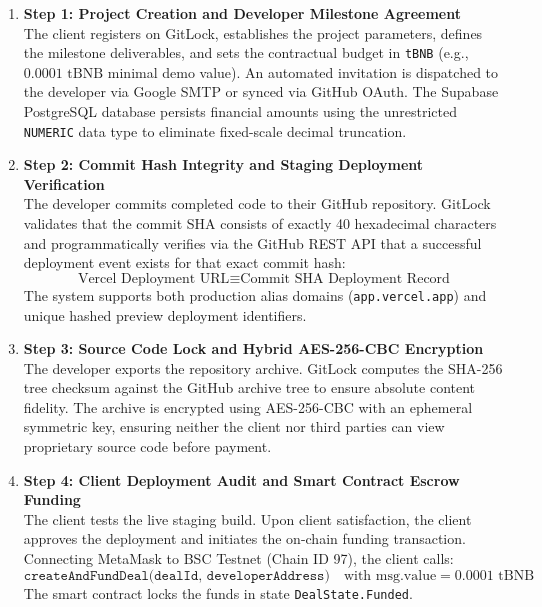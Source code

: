 \documentclass[11pt,a4paper]{article}
\begin{document}
\begin{enumerate}
    \item \textbf{Step 1: Project Creation and Developer Milestone Agreement} \\
    The client registers on GitLock, establishes the project parameters, defines the milestone deliverables, and sets the contractual budget in \texttt{tBNB} (e.g., $0.0001\text{ tBNB}$ minimal demo value). An automated invitation is dispatched to the developer via Google SMTP or synced via GitHub OAuth. The Supabase PostgreSQL database persists financial amounts using the unrestricted \texttt{NUMERIC} data type to eliminate fixed-scale decimal truncation.

    \item \textbf{Step 2: Commit Hash Integrity and Staging Deployment Verification} \\
    The developer commits completed code to their GitHub repository. GitLock validates that the commit SHA consists of exactly 40 hexadecimal characters and programmatically verifies via the GitHub REST API that a successful deployment event exists for that exact commit hash:
    \begin{equation}
        \text{Vercel Deployment URL} \equiv \text{Commit SHA Deployment Record}
    \end{equation}
    The system supports both production alias domains (\texttt{app.vercel.app}) and unique hashed preview deployment identifiers.

    \item \textbf{Step 3: Source Code Lock and Hybrid AES-256-CBC Encryption} \\
    The developer exports the repository archive. GitLock computes the SHA-256 tree checksum against the GitHub archive tree to ensure absolute content fidelity. The archive is encrypted using AES-256-CBC with an ephemeral symmetric key, ensuring neither the client nor third parties can view proprietary source code before payment.

    \item \textbf{Step 4: Client Deployment Audit and Smart Contract Escrow Funding} \\
    The client tests the live staging build. Upon client satisfaction, the client approves the deployment and initiates the on-chain funding transaction. Connecting MetaMask to BSC Testnet (Chain ID 97), the client calls:
    \begin{equation}
        \texttt{createAndFundDeal(dealId, developerAddress)} \quad \text{with } \text{msg.value} = 0.0001\text{ tBNB}
    \end{equation}
    The smart contract locks the funds in state \texttt{DealState.Funded}.


\end{enumerate}
\end{document}
